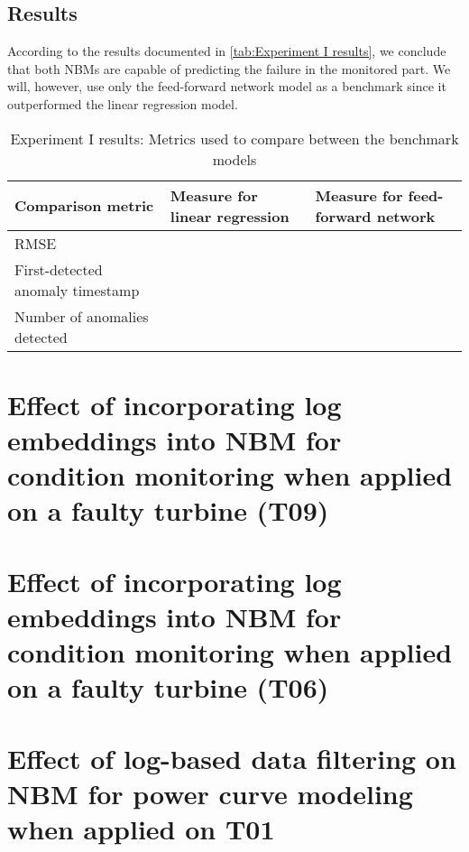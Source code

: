 \subsection{Results}
According to the results documented in \ref{tab:Experiment I results}, we conclude that both NBMs are capable of predicting the failure in the monitored part. We will, however, use only the feed-forward network model as a benchmark since it outperformed the linear regression model.
\begin{table}[H]
        \centering
    \begin{tabular}{|m{4cm}|m{4cm}|m{4cm}|}
    \hline
         \textbf{Comparison metric} & \textbf{Measure for linear regression}   & \textbf{Measure for feed-forward network}\\
         \hline
         RMSE & & \\
         \hline
         First-detected anomaly timestamp & & \\
         \hline
         Number of anomalies detected & & \\
         \hline
    \hline
    \end{tabular}
    \caption{Experiment I results: Metrics used to compare between the benchmark models}
        \label{tab:Experiment II results}
\end{table}

\section{Effect of incorporating log embeddings into NBM for condition monitoring when applied on a faulty turbine (T09)}

\section{Effect of incorporating log embeddings into NBM for condition monitoring when applied on a faulty turbine (T06)}

\section{Effect of log-based data filtering on NBM for power curve modeling when applied on T01}
